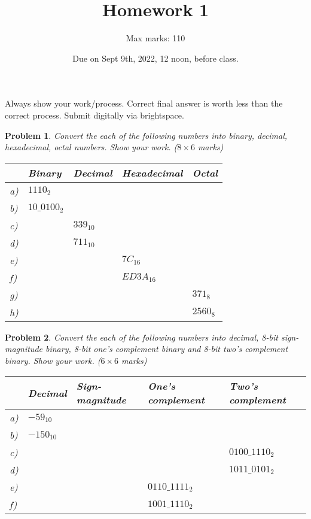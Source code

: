 \documentclass{article}
\title{Homework 1}
\author{Max marks: 110}
\date{Due on Sept 9th, 2022, 12 noon, before class. }
\newtheorem{prob}{Problem}
\begin{document}
\maketitle
Always show your work/process. Correct final answer is worth less than the
correct process. Submit digitally via brightspace.

\begin{prob}
  Convert the each of the following numbers into binary, decimal, hexadecimal,
octal numbers. Show your work. ($8 \times 6 $ marks)

  \begin{tabular}{lllll}
    \toprule
     & Binary & Decimal & Hexadecimal & Octal \\
    \midrule
    a)& $1110_2$     &   &   &    \\
    b)& $10\_0100_2$ &   &   &   \\
    c)&   & $339_{10}$   &   &   \\
    d)&   & $711_{10}$   &   &   \\
    e)&   &   & $7C_{16}$    &   \\
    f)&   &   & $ED3A_{16}$  &   \\
    g)&   &   &   & $371_8$\\
    h)&   &   &   & $2560_8$\\
    \bottomrule
  \end{tabular}
\end{prob}

\vspace{20em}

\begin{prob}
  Convert the each of the following numbers into decimal, 8-bit sign-magnitude binary,
  8-bit one's complement binary and 8-bit two's complement binary. Show your work. ($6 \times 6 $ marks)

  \begin{tabular}{lllll}
    \toprule
    & Decimal & Sign-magnitude & One's complement & Two's complement \\
    \midrule
    a) & $-59_{10}$ & & & \\
    b) & $-150_{10}$ & & & \\
    c) & & & & $0100\_1110_2$ \\
    d) & &  & & $1011\_0101_2$\\
    e) & & & $0110\_1111_2$&  \\
    f) & &  & $1001\_1110_2$& \\
    \bottomrule
  \end{tabular}
\end{prob}
\end{document}
